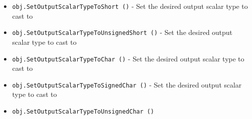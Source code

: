 \begin{itemize}
\item  \verb|obj.SetOutputScalarTypeToShort ()| -  Set the desired output scalar type to cast to

\item  \verb|obj.SetOutputScalarTypeToUnsignedShort ()| -  Set the desired output scalar type to cast to

\item  \verb|obj.SetOutputScalarTypeToChar ()| -  Set the desired output scalar type to cast to

\item  \verb|obj.SetOutputScalarTypeToSignedChar ()| -  Set the desired output scalar type to cast to

\item  \verb|obj.SetOutputScalarTypeToUnsignedChar ()|

\end{itemize}
